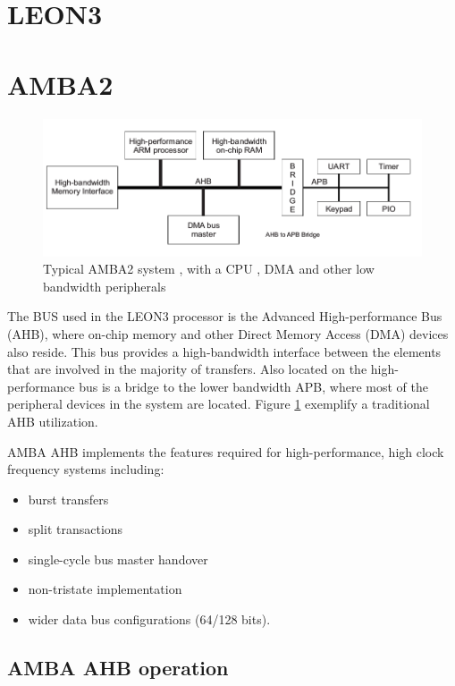 \section{LEON3}

\section{AMBA2}
\begin{figure}[ht]
    \centering
    \includegraphics[width=1\textwidth]{figures/others/typica_ahb.png}
    \caption{Typical AMBA2 system , with a CPU , DMA and other low bandwidth peripherals }
    \label{fig:general}
\end{figure}

The BUS used in the LEON3 processor is the Advanced High-performance Bus (AHB), where on-chip memory and other Direct Memory Access (DMA) devices also reside. This bus provides a high-bandwidth interface between the elements that are involved in the majority of transfers. Also located on the high-performance bus is a bridge to the lower bandwidth APB, where most of the peripheral devices in the system are located. Figure \ref{fig:general} exemplify a traditional AHB utilization.


AMBA AHB implements the features required for high-performance, high clock
frequency systems including:
\begin{itemize}
 \item {burst transfers}
\item {split transactions}
\item {single-cycle bus master handover}
\item {non-tristate implementation}
\item {wider data bus configurations (64/128 bits).}
\end{itemize}

 
\subsection{AMBA AHB operation}

